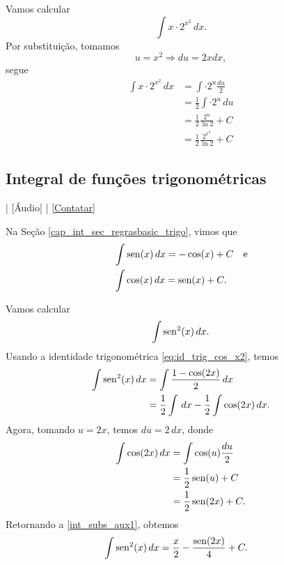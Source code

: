 \begin{ex}
  Vamos calcular
  \begin{equation}
    \int x\cdot 2^{x^2}\,dx.
  \end{equation}
  Por substituição, tomamos
  \begin{equation}
    u = x^2 \Rightarrow du = 2xdx,
  \end{equation}
  segue
  \begin{align}
    \int x\cdot 2^{x^2}\,dx &= \int \cdot 2^{u}\frac{du}{2} \\
                            &= \frac{1}{2}\int \cdot 2^{u}\,du \\
                            &= \frac{1}{2}\frac{2^u}{\ln 2} + C \\
                            &= \frac{1}{2}\frac{2^{x^2}}{\ln 2} + C
  \end{align}
\end{ex}

\subsection{Integral de funções trigonométricas}

\begin{flushright}
  [Vídeo] | [Áudio] | \href{https://phkonzen.github.io/notas/contato.html}{[Contatar]}
\end{flushright}

Na Seção \ref{cap_int_sec_regrasbasic_trigo}, vimos que
\begin{align}
  &\int \operatorname{sen}(x)\,dx = -\cos(x) + C \quad\text{e}\\
  &\int \cos(x)\,dx = \operatorname{sen}(x) + C.
\end{align}

\begin{ex}
  Vamos calcular
  \begin{equation}
    \int \operatorname{sen}^2(x)\,dx.
  \end{equation}
  Usando a identidade trigonométrica \ref{eq:id_trig_cos_x2}, temos
  \begin{align}
    \int \operatorname{sen}^2(x)\,dx &= \int \frac{1-\cos(2x)}{2}\,dx \\
                       &= \frac{1}{2}\int\,dx - \frac{1}{2}\int\cos(2x)\,dx.\label{int_subs_aux1}
  \end{align}
  Agora, tomando $u = 2x$, temos $du = 2\,dx$, donde
  \begin{align}
    \int \cos(2x)\,dx &= \int\cos(u)\frac{du}{2} \\
                      &= \frac{1}{2}\operatorname{sen}(u) + C \\
                      &= \frac{1}{2}\operatorname{sen}(2x) + C.
  \end{align}
  Retornando a \ref{int_subs_aux1}, obtemos
  \begin{align}
    \int \operatorname{sen}^2(x)\,dx &= \frac{x}{2} - \frac{\operatorname{sen}(2x)}{4} + C.
  \end{align}
\end{ex}

